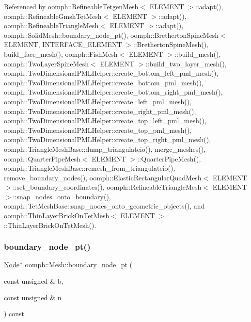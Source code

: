 Referenced by oomph\+::\+Refineable\+Tetgen\+Mesh$<$ E\+L\+E\+M\+E\+N\+T $>$\+::adapt(), oomph\+::\+Refineable\+Gmsh\+Tet\+Mesh$<$ E\+L\+E\+M\+E\+N\+T $>$\+::adapt(), oomph\+::\+Refineable\+Triangle\+Mesh$<$ E\+L\+E\+M\+E\+N\+T $>$\+::adapt(), oomph\+::\+Solid\+Mesh\+::boundary\+\_\+node\+\_\+pt(), oomph\+::\+Bretherton\+Spine\+Mesh$<$ E\+L\+E\+M\+E\+N\+T, I\+N\+T\+E\+R\+F\+A\+C\+E\+\_\+\+E\+L\+E\+M\+E\+N\+T $>$\+::\+Bretherton\+Spine\+Mesh(), build\+\_\+face\+\_\+mesh(), oomph\+::\+Fish\+Mesh$<$ E\+L\+E\+M\+E\+N\+T $>$\+::build\+\_\+mesh(), oomph\+::\+Two\+Layer\+Spine\+Mesh$<$ E\+L\+E\+M\+E\+N\+T $>$\+::build\+\_\+two\+\_\+layer\+\_\+mesh(), oomph\+::\+Two\+Dimensional\+P\+M\+L\+Helper\+::create\+\_\+bottom\+\_\+left\+\_\+pml\+\_\+mesh(), oomph\+::\+Two\+Dimensional\+P\+M\+L\+Helper\+::create\+\_\+bottom\+\_\+pml\+\_\+mesh(), oomph\+::\+Two\+Dimensional\+P\+M\+L\+Helper\+::create\+\_\+bottom\+\_\+right\+\_\+pml\+\_\+mesh(), oomph\+::\+Two\+Dimensional\+P\+M\+L\+Helper\+::create\+\_\+left\+\_\+pml\+\_\+mesh(), oomph\+::\+Two\+Dimensional\+P\+M\+L\+Helper\+::create\+\_\+right\+\_\+pml\+\_\+mesh(), oomph\+::\+Two\+Dimensional\+P\+M\+L\+Helper\+::create\+\_\+top\+\_\+left\+\_\+pml\+\_\+mesh(), oomph\+::\+Two\+Dimensional\+P\+M\+L\+Helper\+::create\+\_\+top\+\_\+pml\+\_\+mesh(), oomph\+::\+Two\+Dimensional\+P\+M\+L\+Helper\+::create\+\_\+top\+\_\+right\+\_\+pml\+\_\+mesh(), oomph\+::\+Triangle\+Mesh\+Base\+::dump\+\_\+triangulateio(), merge\+\_\+meshes(), oomph\+::\+Quarter\+Pipe\+Mesh$<$ E\+L\+E\+M\+E\+N\+T $>$\+::\+Quarter\+Pipe\+Mesh(), oomph\+::\+Triangle\+Mesh\+Base\+::remesh\+\_\+from\+\_\+triangulateio(), remove\+\_\+boundary\+\_\+nodes(), oomph\+::\+Elastic\+Rectangular\+Quad\+Mesh$<$ E\+L\+E\+M\+E\+N\+T $>$\+::set\+\_\+boundary\+\_\+coordinates(), oomph\+::\+Refineable\+Triangle\+Mesh$<$ E\+L\+E\+M\+E\+N\+T $>$\+::snap\+\_\+nodes\+\_\+onto\+\_\+boundary(), oomph\+::\+Tet\+Mesh\+Base\+::snap\+\_\+nodes\+\_\+onto\+\_\+geometric\+\_\+objects(), and oomph\+::\+Thin\+Layer\+Brick\+On\+Tet\+Mesh$<$ E\+L\+E\+M\+E\+N\+T $>$\+::\+Thin\+Layer\+Brick\+On\+Tet\+Mesh().

\mbox{\label{classoomph_1_1Mesh_a0ab2bf2cf4cca88b7a972d1a659c7e5a}} 
\subsubsection{\texorpdfstring{boundary\+\_\+node\+\_\+pt()}{boundary\_node\_pt()}\hspace{0.1cm}{\footnotesize\ttfamily [2/2]}}
{\footnotesize\ttfamily \hyperlink{classoomph_1_1Node}{Node}$\ast$ oomph\+::\+Mesh\+::boundary\+\_\+node\+\_\+pt (\begin{DoxyParamCaption}\item[{const unsigned \&}]{b,  }\item[{const unsigned \&}]{n }\end{DoxyParamCaption}) const\hspace{0.3cm}{\ttfamily [inline]}}



